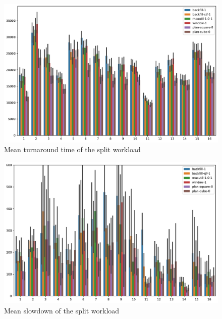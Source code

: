 \documentclass[thesis-en.tex]{subfiles}
\begin{document}
\begin{figure}[p]
    \centering
    \includegraphics[width=\textwidth]{best_alloc-only_parts_turnaround-time.pdf}
    \caption{Mean turnaround time of the split workload}
    \label{fig:best_alloc-only_parts_turnaround-time}
\end{figure}

\begin{figure}[p]
    \centering
    \includegraphics[width=\textwidth]{best_alloc-only_parts_slowdown.pdf}
    \caption{Mean slowdown of the split workload}
    \label{fig:best_alloc-only_parts_slowdown}
\end{figure}
\end{document}

